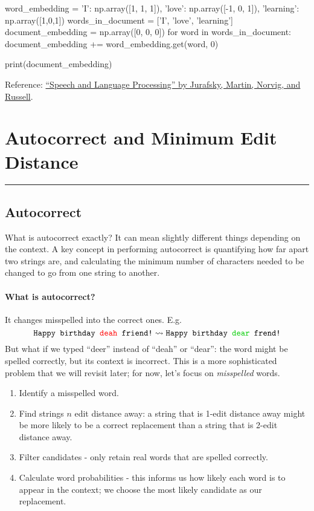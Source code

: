 \documentclass[12pt]{article}
\begin{document}
\begin{python}
word_embedding = {'I': np.array([1, 1, 1]), 'love': np.array([-1, 0, 1]), 'learning': np.array([1,0,1])}
words_in_document = ['I', 'love', 'learning']
document_embedding = np.array([0, 0, 0])
for word in words_in_document:
  document_embedding += word_embedding.get(word, 0)

print(document_embedding)
\end{python}

Reference: \href{https://www.amazon.com/Speech-Language-Processing-Daniel-Jurafsky-ebook-dp-B00XIGSJQK/dp/B00XIGSJQK/ref=mt_kindle?_encoding=UTF8&me=&qid=1591993888}{``Speech   and Language Processing'' by Jurafsky, Martin, Norvig, and Russell}.

\section{Autocorrect and Minimum Edit Distance}\vspace{.1pt} \hrule height 2pt \smallskip \renewcommand{\arraystretch}{1}%
\subsection{Autocorrect} What is autocorrect exactly? It can mean slightly different things depending on the context. A key concept in performing autocorrect is quantifying how far apart two strings are, and calculating the minimum number of characters needed to be changed to go from one string to another.
\paragraph{What is autocorrect?} It changes misspelled into the correct ones. E.g.
\[
  \texttt{Happy birthday {\color{red} deah} friend!} \leadsto \texttt{Happy birthday {\color{green!80!black} dear} frend!}
\]
But what if we typed ``deer'' instead of ``deah'' or ``dear'': the word might be spelled correctly, but its context is incorrect. This is a more sophisticated problem that we will revisit later; for now, let's focus on \emph{misspelled} words.
\begin{enumerate}
\item Identify a misspelled word.
\item Find strings $n$ edit distance away: a string that is 1-edit distance away might be more likely to be a correct replacement than a string that is 2-edit distance away.
\item Filter candidates - only retain real words that are spelled correctly.
\item Calculate word probabilities - this informs us how likely each word is to appear in the context; we choose the most likely candidate as our replacement.
\end{enumerate}
\end{document}
